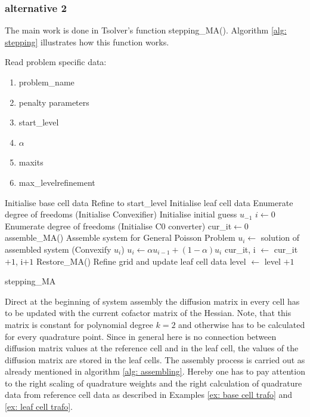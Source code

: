 \subsubsection{alternative 2}
The main work is done in Tsolver's function stepping\_MA(). Algorithm \ref{alg: stepping} illustrates how this function works.
\begin{algorithm}[H]
\begin{algorithmic}
	\State Read problem specific data:
		\begin{enumerate}
			 \item  problem\_name 
			 \item penalty parameters   
			 \item start\_level  
			 \item $\alpha$  
			 \item maxits 
			 \item max\_levelrefinement 
		\end{enumerate}
	\State Initialise base cell data
	\State Refine to start\_level
	\State Initialise leaf cell data
	\State Enumerate degree of freedoms
	\State (Initialise Convexifier)
	\State Initialise initial guess $u_{-1}$
	\State $i \gets 0$
		\State Enumerate degree of freedoms
		\State (Initialise C0 converter) 
		\State cur\_it$ \gets 0$
			\State  assemble\_MA()                              \Comment Assemble system for General Poisson Problem
			\State $u_i \gets$ solution of assembled system
			\State (Convexify $u_i$)		 
			\State $u_i \gets \alpha u_{i-1}  +(1-\alpha) u_i$
			\State	cur\_it, i $\gets$ cur\_it$+1$, i$+1$
			\State Restore\_MA() 		
		\EndWhile
		\State Refine grid and update leaf cell data
		\State level $\gets$ level $+1$
	\EndWhile
\end{algorithmic}
\caption{stepping\_MA}
\label{alg: stepping}
\end{algorithm}

Direct at the beginning of system assembly the diffusion matrix in every cell has to be updated with the current cofactor matrix of the Hessian. Note, that this matrix is constant for polynomial degree $k=2$ and otherwise has to be calculated for every quadrature point. Since in general here is no connection between diffusion matrix values at the reference cell and in the leaf cell, the values of the diffusion matrix are stored in the leaf cells.
The assembly process is carried out as already mentioned in algorithm \ref{alg: assembling}. Hereby one has to pay attention to the right scaling of quadrature weights and the right calculation of quadrature data from reference cell data as described in Examples \ref{ex: base cell trafo} and \ref{ex: leaf cell trafo}. 

